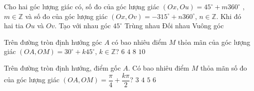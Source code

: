 \begin{ex}%
	Cho hai góc lượng giác có, số đo của góc lượng giác $\left(Ox,Ou\right)=45^\circ +m360^\circ$ , $m\in \mathbb{Z}$ và số đo của góc  lượng giác $\left(Ox,Ov\right)=-315^\circ +n360^\circ$, $n\in \mathbb{Z}$. Khi đó hai tia $Ou$ và $Ov$.
	\choice 
		{Tạo với  nhau góc $45^\circ$}
		{\True  Trùng nhau}
		{Đối  nhau}
		 {Vuông góc}
\end{ex}

\begin{ex}%
	Trên đường tròn định hướng góc $A$ có bao nhiêu điểm $M$ thỏa mãn của góc lượng giác $\left(OA,OM\right)=30^\circ +k45^\circ$, $k\in \mathbb{Z}$? 
	 \choice
		 {$6$}
		{$4$} 
		{\True  $8$}
		 {$10$}
\end{ex}

\begin{ex}%
	Trên đường  tròn định hướng, điểm gốc $A$. Có bao nhiêu điểm $M$ thỏa mãn số đo của góc lượng giác $\left(OA,OM\right) = \dfrac{\pi}{4} + \dfrac{k\pi}{2}$?
	 \choice
		 {$3$}
		{\True $4$} 
		 {$5$}
		 {$6$}
\end{ex}

